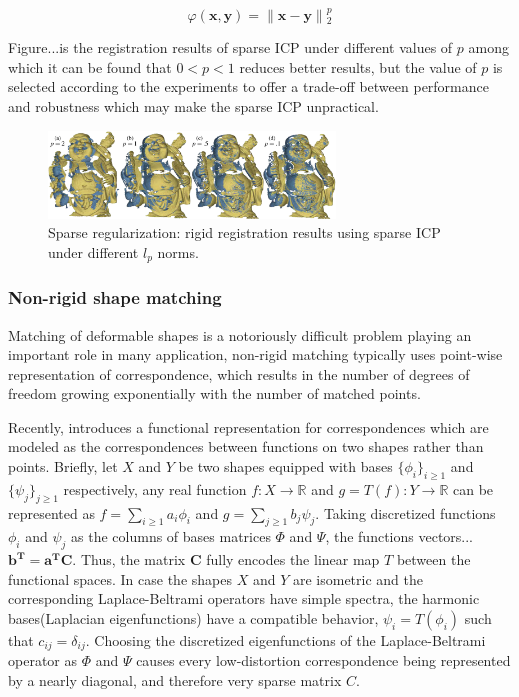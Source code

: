 \small{
\begin{equation}
 \label{eq:permutedsparse}
 \varphi(\mathbf{x},\mathbf{y})=\|\mathbf{x}-\mathbf{y}\|{_2^{p}}
\end{equation}
}

Figure...is the registration results of sparse ICP under different values of $p$ among which it can be found that $0<p<1$ reduces better results, but the value of $p$ is selected according to the experiments to offer a trade-off between performance and robustness which may make the sparse ICP unpractical.

\begin{figure}[ht]
  \centering
  \includegraphics[width=3in]{images/sparseICP}
  \caption{Sparse regularization: rigid registration results using sparse ICP\cite{chartrand2007exact} under different $l_{p}$ norms.}
\end{figure}

\subsubsection{Non-rigid shape matching}
Matching of deformable shapes is a notoriously difficult problem playing an important role in many application, non-rigid matching typically uses point-wise representation of correspondence, which results in the number of degrees of freedom growing exponentially with the number of matched points.

Recently, \cite{ovsjanikov2012functional} introduces a functional representation for correspondences which are modeled as the correspondences between functions on two shapes rather than points.
Briefly, let $X$ and $Y$ be two shapes equipped with bases $\{\phi_{i}\}_{i\ge1}$ and $\{\psi_{j}\}_{j\ge1}$ respectively, any real function $f: X\to \mathbb{R}$ and $g=T(f): Y\to \mathbb{R}$ can be represented as $f=\sum_{i\ge1}^{}a_{i}\phi_{i}$ and $g=\sum_{j\ge1}^{}b_{j}\psi_{j}$.
Taking discretized functions $\phi_{i}$ and $\psi_{j}$ as the columns of bases matrices $\Phi$ and $\Psi$, the functions vectors...$\mathbf{b^{T}}=\mathbf{a^{T}C}$. Thus, the matrix $\mathbf{C}$ fully encodes the linear map $T$ between the functional spaces.
In case the shapes $X$ and $Y$ are isometric and the corresponding Laplace-Beltrami operators have simple spectra, the harmonic bases(Laplacian eigenfunctions) have a compatible behavior, $\psi_{i}=T(\phi_{i})$ such that $c_{ij}=\delta_{ij}$.
Choosing the discretized eigenfunctions of the Laplace-Beltrami operator as $\Phi$ and $\Psi$ causes every low-distortion correspondence being represented by a nearly diagonal, and therefore very sparse matrix $C$.

